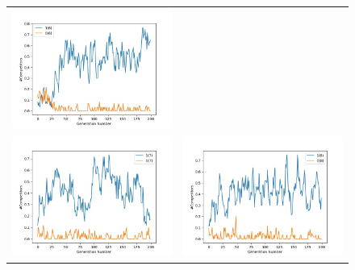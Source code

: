 \documentclass{article}
\begin{document}
\begin{figure}[H]
\begin{adjustbox}{width=0.6\paperwidth}
\begin{tabular}{c c}
				\includegraphics{Codes/Problem_1 Construction_2/Comp_6.jpg}\\
				\includegraphics{Codes/Problem_1 Construction_2/Comp_7.jpg} & \includegraphics{Codes/Problem_1 Construction_2/Comp_8.jpg} \\

\end{tabular}
\end{adjustbox}
\end{figure}
\end{document}
